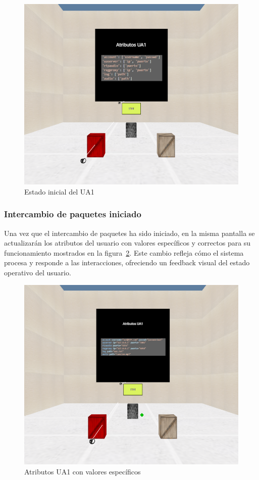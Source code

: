 \documentclass[a4paper, 12pt]{book}
\begin{document}
\begin{figure}
  \centering
  \includegraphics[width=15cm, keepaspectratio]{img/resultados/UA1_NoIniciado.png}
  \caption{Estado inicial del UA1}
  \label{fig:UA1_NoIniciado}
\end{figure}


\subsubsection{Intercambio de paquetes iniciado}
\label{subsubsec:Intercambio_Iniciado}
Una vez que el intercambio de paquetes ha sido iniciado, en la misma pantalla se 
actualizarán los atributos del usuario con valores específicos y correctos para su funcionamiento mostrados en la figura~\ref{fig:UA1_Iniciado}.  
Este cambio refleja cómo el sistema procesa y responde a las interacciones, ofreciendo un feedback visual del estado operativo del usuario.

\begin{figure}
  \centering
  \includegraphics[width=15cm, keepaspectratio]{img/resultados/UA1_Iniciado.png}
  \caption{Atributos UA1 con valores específicos}
  \label{fig:UA1_Iniciado}
\end{figure}
\end{document}
